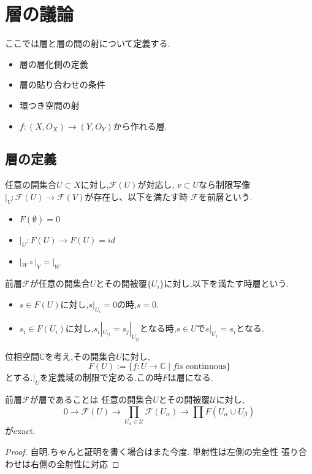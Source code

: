\section{層の議論}
ここでは層と層の間の射について定義する.
\begin{itemize}
\item 層の層化側の定義
\item 層の貼り合わせの条件
\item 環つき空間の射
\item $f:(X, O_X) \to (Y, O_Y)$から作れる層.
\end{itemize}


\subsection{層の定義}

\begin{screen}
\begin{dfn}
 任意の開集合$U \subset X$に対し,$\mathcal{F}(U)$が対応し,
 $v \subset U$なら制限写像$|_V: \mathcal{F}(U) \to \mathcal{F}(V)$が存在し、以下を満たす時
 $\mathcal{F}$を前層という.
 \begin{itemize}
   \item $F(\emptyset) = 0$
   \item $|_U:F(U) \to F(U) = id$
   \item $|_W \circ |_V = |_W$
 \end{itemize}
 前層$\mathcal{F}$が任意の開集合$U$とその開被覆$\{U_i\}$に対し,以下を満たす時層という.
 \begin{itemize}
   \item $s \in F(U)$に対し,$s|_{U_i}=0$の時,$s=0$.
   \item $s_i \in F(U_i)$に対し,$s_i|_{U_{ij}}= s_j|_{U_{ij}}$となる時,$s \in U$で$s|_{U_i} = s_i$となる.
 \end{itemize}
\end{dfn}
\end{screen}


\begin{epl}
位相空間$\mathbb{C}$を考え,その開集合$U$に対し,
\begin{equation*}
F(U) := \{f:U \to \mathbb{C} \mid f \mbox{is continuous} \}
\end{equation*}
とする.$|_U$を定義域の制限で定める.この時$F$は層になる.
\end{epl}

\begin{lem}
前層$\mathcal{F}$が層であることは
任意の開集合$U$とその開被覆$\mathcal{U}$に対し,
\begin{equation*}
 0 \to \mathcal{F}(U) \to \prod_{U_{\alpha} \in \mathcal{U}} \mathcal{F}(U_{\alpha})
   \to \prod F(U_{\alpha} \cup U_{\beta})
\end{equation*}
がexact.
\end{lem}
\begin{proof}
自明.ちゃんと証明を書く場合はまた今度.
単射性は左側の完全性
張り合わせは右側の全射性に対応
\end{proof}

